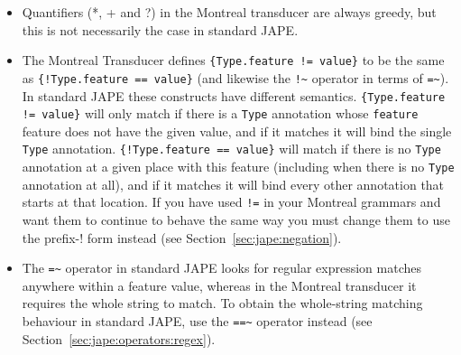 \begin{itemize}
\item Quantifiers (*, + and ?) in the Montreal transducer are always greedy,
      but this is not necessarily the case in standard JAPE.
\item The Montreal Transducer defines \verb|{Type.feature != value}| to be the
      same as \verb|{!Type.feature == value}| (and likewise the \verb|!~|
      operator in terms of \verb|=~|).  In standard JAPE these constructs have
      different semantics.  \verb|{Type.feature != value}| will only match if
      there is a \verb|Type| annotation whose \verb|feature| feature does not
      have the given value, and if it matches it will bind the single
      \verb|Type| annotation.  \verb|{!Type.feature == value}| will match if
      there is no \verb|Type| annotation at a given place with this feature
      (including when there is no \verb|Type| annotation at all), and if it
      matches it will bind every other annotation that starts at that location.
      If you have used \verb|!=| in your Montreal grammars and want them to
      continue to behave the same way you must change them to use the prefix-!
      form instead (see Section~\ref{sec:jape:negation}).
\item The \verb|=~| operator in standard JAPE looks for regular expression
      matches anywhere within a feature value, whereas in the Montreal
      transducer it requires the whole string to match.  To obtain the
      whole-string matching behaviour in standard JAPE, use the \verb|==~|
      operator instead (see Section~\ref{sec:jape:operators:regex}).
\end{itemize}

